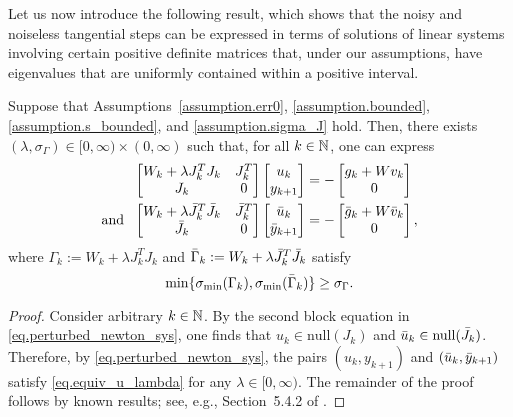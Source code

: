 Let us now introduce the following result, which shows that the noisy and noiseless tangential steps can be expressed in terms of solutions of linear systems involving certain positive definite matrices that, under our assumptions, have eigenvalues that are uniformly contained within a positive interval.

\begin{lemma}\label{lemma.equiv_u_lambda}
  Suppose that Assumptions~\ref{assumption.err0}, \ref{assumption.bounded}, \ref{assumption.s_bounded}, and \ref{assumption.sigma_J} hold.  Then, there exists $(\lambda,\sigma_\Gamma) \in [0,\infty) \times (0,\infty)$ such that, for all $k \in \mathbb{N}$, one can express
  \begin{equation}\label{eq.equiv_u_lambda}
    \begin{aligned}
      \begin{bmatrix} W_k + \lambda J_k^T J_k & J_k^T \\ J_k & 0 \end{bmatrix} \begin{bmatrix} u_k \\ y_{k+1} \end{bmatrix} &= -\begin{bmatrix} g_k + W v_k \\ 0 \end{bmatrix} \\ \text{and}\ \ \begin{bmatrix} W_k + \lambda \Jtrue_k^T \Jtrue_k  & \Jtrue_k^T \\ \Jtrue_k & 0 \end{bmatrix} \begin{bmatrix} \utrue_k \\ \bar y_{k+1} \end{bmatrix} &= -\begin{bmatrix} \gtrue_k + W \vtrue_k \\ 0 \end{bmatrix},
    \end{aligned}
  \end{equation}
  where $\Gamma_k := W_k + \lambda J_k^TJ_k$ and ${\bar \Gamma}_k := W_k + \lambda {\bar J}_k^T{\bar J}_k$ satisfy
  \begin{equation*}
    \min\{\sigma_{\min}(\Gamma_k),\sigma_{\min}({\bar \Gamma}_k)\} \geq \sigma_\Gamma.
  \end{equation*}
\end{lemma}
\begin{proof}
  Consider arbitrary $k \in \mathbb{N}$.  By the second block equation in \eqref{eq.perturbed_newton_sys}, one finds that $u_k \in \mathrm{null}(J_k)$ and ${\bar u}_k \in \mathrm{null}({\bar J}_k)$.  Therefore, by \eqref{eq.perturbed_newton_sys}, the pairs $(u_k,y_{k+1})$ and $({\bar u}_k,{\bar y}_{k+1})$ satisfy \eqref{eq.equiv_u_lambda} for any $\lambda \in [0,\infty)$.  The remainder of the proof follows by known results; see, e.g., Section~5.4.2 of \cite{gill2019practical}.
\end{proof}

